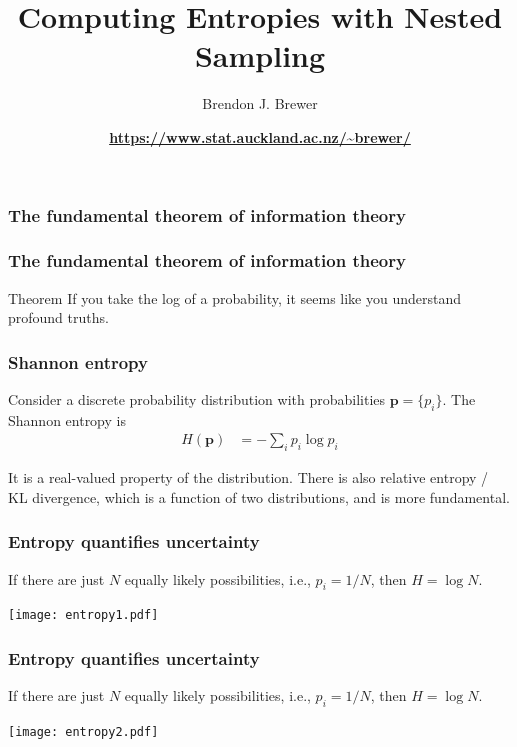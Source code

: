 \documentclass{beamer}
\title{Computing Entropies with Nested Sampling}
\author{Brendon J. Brewer}
\institute{Department of Statistics\\
The University of Auckland}
\date{\color{blue}\bf \url{https://www.stat.auckland.ac.nz/~brewer/}}
\begin{document}
\frame{\titlepage}


\begin{frame}
\frametitle{The fundamental theorem of information theory}

\end{frame}


\begin{frame}
\frametitle{The fundamental theorem of information theory}

\begin{block}{Theorem}
If you take the log of a probability, it seems like you understand profound
truths.
\end{block}


\end{frame}


\begin{frame}
\frametitle{Shannon entropy}

Consider a discrete probability distribution with probabilities
$\boldsymbol{p} = \{p_i\}$. The Shannon entropy is
\begin{align}
H(\boldsymbol{p}) &= -\sum_i p_i \log p_i
\end{align}

It is a real-valued property of the distribution.
There is also relative entropy / KL divergence,
which is a function of two distributions, and is more fundamental.

\end{frame}

\begin{frame}
\frametitle{Entropy quantifies uncertainty}
If there are just $N$ equally likely possibilities,
i.e., $p_i = 1/N$, then $H = \log N$. \vspace{0.5em}

\begin{center}
\texttt{[image: entropy1.pdf]}
\end{center}

\end{frame}


\begin{frame}
\frametitle{Entropy quantifies uncertainty}
If there are just $N$ equally likely possibilities,
i.e., $p_i = 1/N$, then $H = \log N$. \vspace{0.5em}

\begin{center}
\texttt{[image: entropy2.pdf]}
\end{center}

\end{frame}
\end{document}
